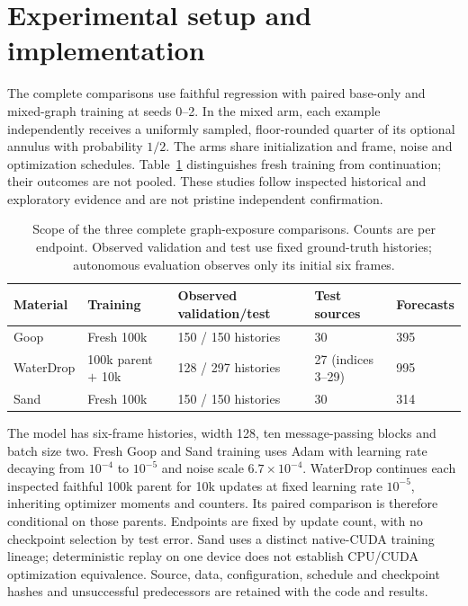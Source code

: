 \appendix
\onecolumn

\section{Experimental setup and implementation}
\label{sec:implementation-details}
The complete comparisons use faithful regression with paired base-only and mixed-graph training at seeds 0--2. In the mixed arm, each example independently receives a uniformly sampled, floor-rounded quarter of its optional annulus with probability $1/2$. The arms share initialization and frame, noise and optimization schedules. Table~\ref{tab:experiment-scope} distinguishes fresh training from continuation; their outcomes are not pooled. These studies follow inspected historical and exploratory evidence and are not pristine independent confirmation.

\begin{table}[!ht]
\centering\small
\caption{Scope of the three complete graph-exposure comparisons. Counts are per endpoint. Observed validation and test use fixed ground-truth histories; autonomous evaluation observes only its initial six frames.}
\label{tab:experiment-scope}
\begin{tabular}{lllll}
\toprule
Material & Training & Observed validation/test & Test sources & Forecasts\\
\midrule
Goop & Fresh 100k & 150 / 150 histories & 30 & 395\\
WaterDrop & 100k parent $+$ 10k & 128 / 297 histories & 27 (indices 3--29) & 995\\
Sand & Fresh 100k & 150 / 150 histories & 30 & 314\\
\bottomrule
\end{tabular}
\end{table}

The model has six-frame histories, width 128, ten message-passing blocks and batch size two. Fresh Goop and Sand training uses Adam with learning rate decaying from $10^{-4}$ to $10^{-5}$ and noise scale $6.7\times10^{-4}$. WaterDrop continues each inspected faithful 100k parent for 10k updates at fixed learning rate $10^{-5}$, inheriting optimizer moments and counters. Its paired comparison is therefore conditional on those parents. Endpoints are fixed by update count, with no checkpoint selection by test error. Sand uses a distinct native-CUDA training lineage; deterministic replay on one device does not establish CPU/CUDA optimization equivalence. Source, data, configuration, schedule and checkpoint hashes and unsuccessful predecessors are retained with the code and results.

